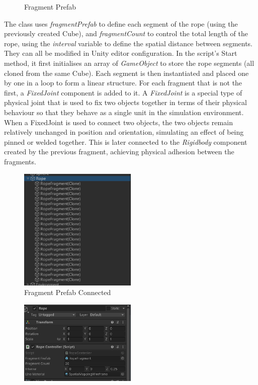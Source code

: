 \documentclass[12pt]{article}
\begin{document}
\begin{enumerate}
\begin{figure}[H]
            \caption{Fragment Prefab}
      \end{figure}
      The class uses \emph{fragmentPrefab} to define each segment of the rope (using the previously created Cube), and \emph{fragmentCount } to control the total length of the rope, using the \emph{interval} variable to define the spatial distance between segments. They can all be modified in Unity editor configuration. In the script's Start method, it first initialises an array of \emph{GameObject} to store the rope segments (all cloned from the same Cube). Each segment is then instantiated and placed one by one in a loop to form a linear structure. For each fragment that is not the first, a \emph{FixedJoint } component is added to it. A \emph{FixedJoint} is a special type of physical joint that is used to fix two objects together in terms of their physical behaviour so that they behave as a single unit in the simulation environment\cite{UnityFixedJoint2024}. When a FixedJoint is used to connect two objects, the two objects remain relatively unchanged in position and orientation, simulating an effect of being pinned or welded together. This is later connected to the \emph{Rigidbody} component created by the previous fragment, achieving physical adhesion between the fragments.
      \begin{figure}[H]
            \centering
            \includegraphics[width=0.5\textwidth]{rope colon.png}
            \caption{Fragment Prefab Connected }
      \end{figure}
      \begin{figure}[H]
            \centering
            \includegraphics[width=0.5\textwidth]{rope setting.png}

\end{figure}
\end{enumerate}
\end{document}
